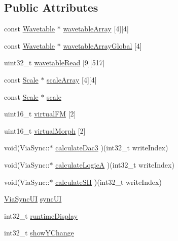 \subsection*{Public Attributes}
\begin{DoxyCompactItemize}
\item 
const \mbox{\hyperlink{struct_wavetable}{Wavetable}} $\ast$ \mbox{\hyperlink{class_via_sync_a421aef9430e9c2af3026a8b8b6efc2b8}{wavetable\+Array}} \mbox{[}4\mbox{]}\mbox{[}4\mbox{]}
\item 
const \mbox{\hyperlink{struct_wavetable}{Wavetable}} $\ast$ \mbox{\hyperlink{class_via_sync_aacd77d7c631a429ccb9ec592cd81adf7}{wavetable\+Array\+Global}} \mbox{[}4\mbox{]}
\item 
uint32\+\_\+t \mbox{\hyperlink{class_via_sync_adeace97188f665b4b7e4d50c91cd42b6}{wavetable\+Read}} \mbox{[}9\mbox{]}\mbox{[}517\mbox{]}
\item 
const \mbox{\hyperlink{struct_scale}{Scale}} $\ast$ \mbox{\hyperlink{class_via_sync_a162046891bb80b88ea683a2e37cf00b4}{scale\+Array}} \mbox{[}4\mbox{]}\mbox{[}4\mbox{]}
\item 
const \mbox{\hyperlink{struct_scale}{Scale}} $\ast$ \mbox{\hyperlink{class_via_sync_a21039946d5bad7741e7f342149253e2c}{scale}}
\item 
uint16\+\_\+t \mbox{\hyperlink{class_via_sync_a8c088bdfe1858e949f33954572f0cb26}{virtual\+FM}} \mbox{[}2\mbox{]}
\item 
uint16\+\_\+t \mbox{\hyperlink{class_via_sync_a809f6405291356f76c408a4024d2192d}{virtual\+Morph}} \mbox{[}2\mbox{]}
\item 
void(Via\+Sync\+::$\ast$ \mbox{\hyperlink{class_via_sync_a860a8bb6bf093193a468033192a7b857}{calculate\+Dac3}} )(int32\+\_\+t write\+Index)
\item 
void(Via\+Sync\+::$\ast$ \mbox{\hyperlink{class_via_sync_a9ee32a34a997a3d8283c9a2abfa7fc4e}{calculate\+LogicA}} )(int32\+\_\+t write\+Index)
\item 
void(Via\+Sync\+::$\ast$ \mbox{\hyperlink{class_via_sync_ad4bd4c345fdd6f6e0f4ad3666f36adf7}{calculate\+SH}} )(int32\+\_\+t write\+Index)
\item 
\mbox{\hyperlink{class_via_sync_1_1_via_sync_u_i}{Via\+Sync\+UI}} \mbox{\hyperlink{class_via_sync_a0aa62004d6d2c1c26616379596172542}{sync\+UI}}
\item 
int32\+\_\+t \mbox{\hyperlink{class_via_sync_abd8dfb51ed608082fac355d06bde3c7b}{runtime\+Display}}
\item 
int32\+\_\+t \mbox{\hyperlink{class_via_sync_a5f847b5346310d3ae010cf1d68e6ec34}{show\+Y\+Change}}

\end{DoxyCompactItemize}
